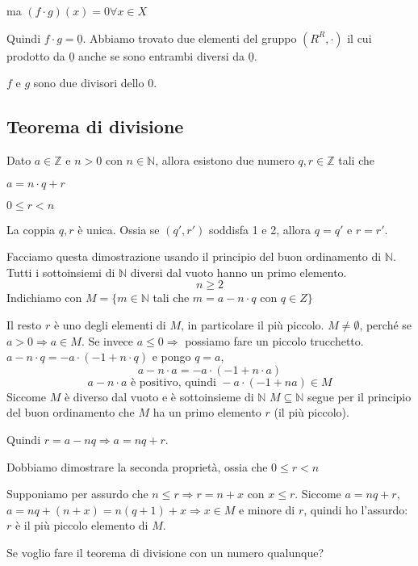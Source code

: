 ma $(f \cdot g) (x) = 0 \forall x \in X$

Quindi $f \cdot g = \underline{0}$. Abbiamo trovato due elementi del gruppo $(R^R, \cdot)$ il cui prodotto da $\underline{0}$ anche se sono entrambi diversi da $\underline{0}$.

$f$ e $g$ sono due divisori dello 0.

\subsection{Teorema di divisione}

Dato $a \in \mathbb{Z}$ e $n > 0$ con $n \in \mathbb{N}$, allora esistono due numero $q, r \in \mathbb{Z}$ tali che
\begin{description}
    \item $a = n \cdot q + r$
    \item $0 \le r < n$
\end{description}
La coppia $q, r$ \`e unica. Ossia se $(q', r')$ soddisfa 1 e 2, allora $q = q'$ e $r = r'$.

Facciamo questa dimostrazione usando il principio del buon ordinamento di $\mathbb{N}$. Tutti i sottoinsiemi di $\mathbb{N}$ diversi dal vuoto hanno un primo elemento.
\[
n \ge 2
\]
Indichiamo con $M = \{ m \in \mathbb{N}$ tali che $m = a - n \cdot q$ con $q \in Z \}$

Il resto $r$ \`e uno degli elementi di $M$, in particolare il pi\`u piccolo. $M \neq \emptyset$, perch\'e se $a > 0 \Rightarrow a \in M$. Se invece $a \le 0 \Rightarrow$ possiamo fare un piccolo trucchetto. $a - n \cdot q = - a \cdot (-1 + n \cdot q)$ e pongo $q = a$,
\[
a - n \cdot a = - a \cdot (-1 + n \cdot a)
\]
\[
a - n \cdot a \text{ \`e positivo, quindi } - a \cdot (-1 + n a) \in M
\]
Siccome $M$ \`e diverso dal vuoto e \`e sottoinsieme di $\mathbb{N}$
$M \subseteq \mathbb{N}$
segue per il principio del buon ordinamento che $M$ ha un primo elemento $r$ (il pi\`u piccolo).

Quindi $r = a - n q \Rightarrow a = n q + r$.

Dobbiamo dimostrare la seconda propriet\`a, ossia che $0 \le r < n$

Supponiamo per assurdo che $n \le r \Rightarrow r = n + x$ con $x \le r$. Siccome $a = n q + r$, $a = n q + (n + x) = n (q + 1) + x \Rightarrow x \in M$ e minore di $r$, quindi ho l'assurdo: $r$ \`e il pi\`u piccolo elemento di $M$.

Se voglio fare il teorema di divisione con un numero qualunque?

